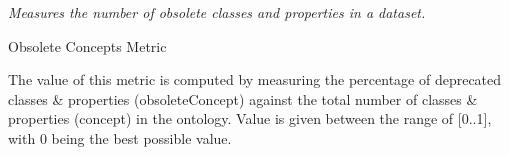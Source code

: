 \begin{mdframed}[style=metricdefinition]
\emph{Measures the number of obsolete classes and properties in a dataset.}
\end{mdframed}

\begin{algorithm}
\caption{Obsolete Concepts Metric}
\begin{algorithmic}[1]
  \EndIf 
{}  \EndIf 
\EndProcedure
\end{algorithmic}
\end{algorithm}

The value of this metric is computed by measuring the percentage of deprecated classes & properties (obsoleteConcept) against the total number of classes & properties (concept) in the ontology. 
Value is given between the range of [0..1], with 0 being the best possible value.

